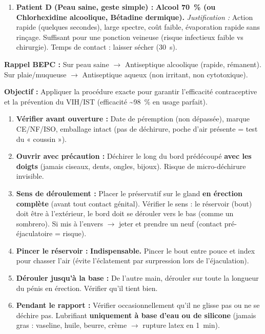 \documentclass[11pt]{article}
\begin{document}
\begin{exoresolu}
\begin{enumerate}
        \item \textbf{Patient D (Peau saine, geste simple) :} \textbf{Alcool \SI{70}{\percent} (ou Chlorhexidine alcoolique, Bétadine dermique).} \textit{Justification :} Action rapide (quelques secondes), large spectre, coût faible, évaporation rapide sans rinçage. Suffisant pour une ponction veineuse (risque infectieux faible vs chirurgie). Temps de contact : laisser sécher (\SI{30}{\second}).
    \end{enumerate}
    \textbf{Rappel BEPC :} Sur peau saine $\rightarrow$ Antiseptique alcoolique (rapide, rémanent). Sur plaie/muqueuse $\rightarrow$ Antiseptique aqueux (non irritant, non cytotoxique).
\end{exoresolu}

\begin{methode}
    \textbf{Objectif :} Appliquer la procédure exacte pour garantir l'efficacité contraceptive et la prévention du VIH/IST (efficacité \textasciitilde \SI{98}{\percent} en usage parfait).
    \begin{enumerate}
        \item \textbf{Vérifier avant ouverture :} Date de péremption (non dépassée), marque CE/NF/ISO, emballage intact (pas de déchirure, poche d'air présente = test du « coussin »).
        \item \textbf{Ouvrir avec précaution :} Déchirer le long du bord prédécoupé \textbf{avec les doigts} (jamais ciseaux, dents, ongles, bijoux). Risque de micro-déchirure invisible.
        \item \textbf{Sens de déroulement :} Placer le préservatif sur le gland \textbf{en érection complète} (avant tout contact génital). Vérifier le sens : le réservoir (bout) doit être à l'extérieur, le bord doit se dérouler vers le bas (comme un sombrero). Si mis à l'envers $\rightarrow$ jeter et prendre un neuf (contact pré-éjaculatoire = risque).
        \item \textbf{Pincer le réservoir :} \textbf{Indispensable.} Pincer le bout entre pouce et index pour chasser l'air (évite l'éclatement par surpression lors de l'éjaculation).
        \item \textbf{Dérouler jusqu'à la base :} De l'autre main, dérouler sur toute la longueur du pénis en érection. Vérifier qu'il tient bien.
        \item \textbf{Pendant le rapport :} Vérifier occasionnellement qu'il ne glisse pas ou ne se déchire pas. Lubrifiant \textbf{uniquement à base d'eau ou de silicone} (jamais gras : vaseline, huile, beurre, crème $\rightarrow$ rupture latex en \SI{1}{\minute}).

\end{enumerate}
\end{methode}
\end{document}
